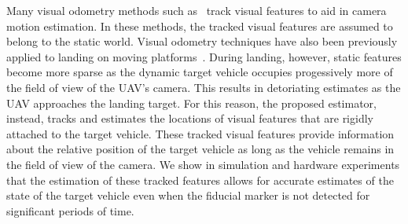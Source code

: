 Many visual odometry methods such
as~\cite{qin2018vins,leutenegger2013keyframe,mourikis2007multi,mur2015orb,wang2018ego}
track visual features to aid in camera motion estimation.
In these methods, the tracked visual features are assumed to belong to the
static world.
Visual odometry techniques
have also been previously applied to landing on
moving platforms~\cite{falanga2017vision}.
During landing, however, static features become more sparse as the dynamic target vehicle
occupies progessively more of the
field of view of the UAV's camera. This results in detoriating
estimates as the UAV approaches the landing target.
For this reason, the proposed estimator, instead, tracks and estimates the
locations of
visual features that are rigidly attached to the target vehicle. These tracked
visual features provide information about the relative position of the target
vehicle
as long as the vehicle remains in the field of view of the camera.
We show in simulation and hardware experiments that the estimation of these tracked features allows
for accurate estimates of the state of the target vehicle even
when the fiducial marker is not detected for significant periods of time.


